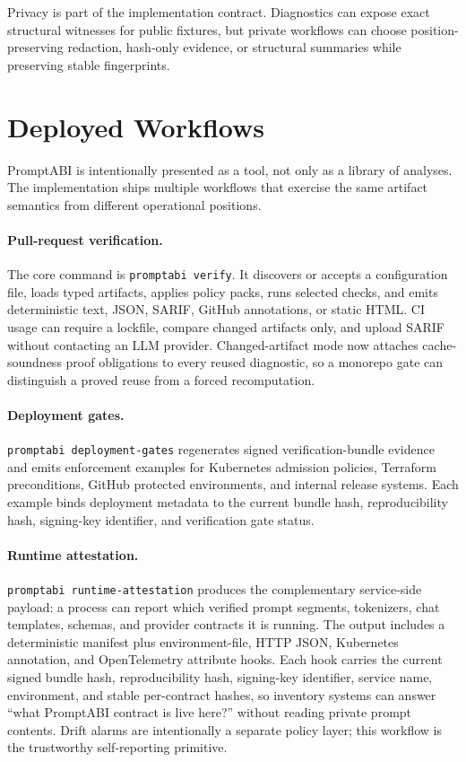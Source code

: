 \documentclass[10pt]{article}
\begin{document}
Privacy is part of the implementation contract. Diagnostics can expose exact
structural witnesses for public fixtures, but private workflows can choose
position-preserving redaction, hash-only evidence, or structural summaries while
preserving stable fingerprints.

\newpage
\section{Deployed Workflows}

PromptABI is intentionally presented as a tool, not only as a library of
analyses. The implementation ships multiple workflows that exercise the same
artifact semantics from different operational positions.

\paragraph{Pull-request verification.}
The core command is \texttt{promptabi verify}. It discovers or accepts a
configuration file, loads typed artifacts, applies policy packs, runs selected
checks, and emits deterministic text, JSON, SARIF, GitHub annotations, or static
HTML. CI usage can require a lockfile, compare changed artifacts only, and
upload SARIF without contacting an LLM provider. Changed-artifact mode now
attaches cache-soundness proof obligations to every reused diagnostic, so a
monorepo gate can distinguish a proved reuse from a forced recomputation.

\paragraph{Deployment gates.}
\texttt{promptabi deployment-gates} regenerates signed verification-bundle
evidence and emits enforcement examples for Kubernetes admission policies,
Terraform preconditions, GitHub protected environments, and internal release
systems. Each example binds deployment metadata to the current bundle hash,
reproducibility hash, signing-key identifier, and verification gate status.

\paragraph{Runtime attestation.}
\texttt{promptabi runtime-attestation} produces the complementary service-side
payload: a process can report which verified prompt segments, tokenizers, chat
templates, schemas, and provider contracts it is running. The output includes a
deterministic manifest plus environment-file, HTTP JSON, Kubernetes annotation,
and OpenTelemetry attribute hooks. Each hook carries the current signed bundle
hash, reproducibility hash, signing-key identifier, service name, environment,
and stable per-contract hashes, so inventory systems can answer ``what PromptABI
contract is live here?'' without reading private prompt contents. Drift alarms
are intentionally a separate policy layer; this workflow is the trustworthy
self-reporting primitive.
\end{document}
